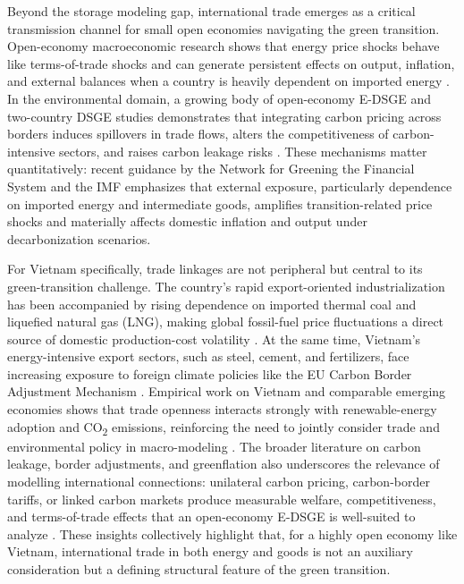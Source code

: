 \documentclass[12pt, a4paper]{article}
\begin{document}
Beyond the storage modeling gap, international trade emerges as a critical transmission channel for small open economies navigating the green transition. Open-economy macroeconomic research shows that energy price shocks behave like terms-of-trade shocks and can generate persistent effects on output, inflation, and external balances when a country is heavily dependent on imported energy \citep{obstfeld1995, corsetti2010}. In the environmental domain, a growing body of open-economy E-DSGE and two-country DSGE studies demonstrates that integrating carbon pricing across borders induces spillovers in trade flows, alters the competitiveness of carbon-intensive sectors, and raises carbon leakage risks \citep{bohringer2018, balke2022}. These mechanisms matter quantitatively: recent guidance by the Network for Greening the Financial System \citep{ngfs2022} and the IMF \citep{imf2021} emphasizes that external exposure, particularly dependence on imported energy and intermediate goods, amplifies transition-related price shocks and materially affects domestic inflation and output under decarbonization scenarios.

For Vietnam specifically, trade linkages are not peripheral but central to its green-transition challenge. The country's rapid export-oriented industrialization has been accompanied by rising dependence on imported thermal coal and liquefied natural gas (LNG), making global fossil-fuel price fluctuations a direct source of domestic production-cost volatility \citep{iea2023, gso2024}. At the same time, Vietnam's energy-intensive export sectors, such as steel, cement, and fertilizers, face increasing exposure to foreign climate policies like the EU Carbon Border Adjustment Mechanism \citep{ec2023}. Empirical work on Vietnam and comparable emerging economies shows that trade openness interacts strongly with renewable-energy adoption and CO\textsubscript{2} emissions, reinforcing the need to jointly consider trade and environmental policy in macro-modeling \citep{almulali2015, vo2020}. The broader literature on carbon leakage, border adjustments, and greenflation also underscores the relevance of modelling international connections: unilateral carbon pricing, carbon-border tariffs, or linked carbon markets produce measurable welfare, competitiveness, and terms-of-trade effects that an open-economy E-DSGE is well-suited to analyze \citep{fischer2012, bohringer2022}. These insights collectively highlight that, for a highly open economy like Vietnam, international trade in both energy and goods is not an auxiliary consideration but a defining structural feature of the green transition.
\end{document}
